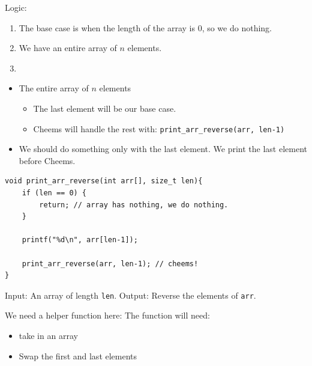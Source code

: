 \documentclass[11pt,a4paper]{article}
\providecommand{\tightlist}{\setlength{\itemsep}{0pt}\setlength{\parskip}{0pt}}
\begin{document}
\label{343-example-printing-an-array-in-reverse}
\hypertarget{343-example-printing-an-array-in-reverse}{}

Logic:

\begin{enumerate}
\def\labelenumi{\arabic{enumi}.}
\tightlist
\item
  The base case is when the length of the array is 0, so we do nothing.
\item
  We have an entire array of \(n\) elements.
\item
\end{enumerate}

\begin{itemize}
\tightlist
\item
  The entire array of \(n\) elements

  \begin{itemize}
  \tightlist
  \item
    The last element will be our base case.
  \item
    Cheems will handle the rest with: \texttt{print\_arr\_reverse(arr,\ len-1)}
  \end{itemize}
\item
  We should do something only with the last element. We print the last element before Cheems.
\end{itemize}

\begin{lstlisting}[style=cscode]
void print_arr_reverse(int arr[], size_t len){
    if (len == 0) {
        return; // array has nothing, we do nothing.
    }

    printf("%d\n", arr[len-1]);

    print_arr_reverse(arr, len-1); // cheems!
}
\end{lstlisting}

\label{example-reverse-an-array}
\hypertarget{example-reverse-an-array}{}

Input: An array of length \texttt{len}. Output: Reverse the elements of \texttt{arr}.

We need a helper function here: The function will need:

\begin{itemize}
\tightlist
\item
  take in an array
\item
  Swap the first and last elements
\end{itemize}
\end{document}
